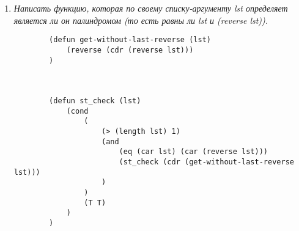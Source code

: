 \begin{enumerate}[wide=0pt]
\begin{lstlisting}
		)
		
		
		(defun check-easy-win (lst)
			(
				or ( = (+ (car lst) (cadr lst)) 7)
				   ( = (+ (car lst) (cadr lst)) 11)
			)
		)
		
		(defun pass_check (lst)
			(
				or
				(   
					and (= (car lst) 1) (= (cadr lst) 1)
				)
				(   
					and (= (car lst) 6) (= (cadr lst) 6)
				)
			)
		)
		
		
		(defun play-game-second-player ()
			(print "Second player throw: ") 
			(setq second_player (bones_throw))
			(print second_player)
		
			(
				cond 
				(
					(check-easy-win second_player)
					(print "Second player wins") 
				)
				(
					(pass_check second_player)
					(play-game-second-player)
				)
				(
					T
					(
						cond
						(
							(
								>
								(+ (car first_player) (cadr first_player))
								(+ (car second_player) (cadr second_player))
							)
							(print "First player wins") 
						)
						(
							(
								<
								(+ (car first_player) (cadr first_player))
								(+ (car second_player) (cadr second_player))
							)
							(print "Second player wins") 
						)
						(
							T
							(print "Draw in the game")
						)
					)
				)
			)
		)
		
		
		(defun play-game-first-player ()
		
			(print "First player throws: ")
			(setq first_player (bones_throw))
			(print first_player)
		
			(
				cond
				(
					(check-easy-win first_player)
					(print "First player wins")
				)
				(
					(pass_check first_player)
					(play-game-first-player)
				)
				(
					T
					(play-game-second-player)
				)
			)
		
		)
		
		
		(play-game-first-player)
	\end{lstlisting}

	\item  \textit{Написать функцию, которая по своему 
	списку-аргументу lst определяет
	является ли он палиндромом (то есть равны ли lst и (reverse lst)).}
	\begin{lstlisting}
		(defun get-without-last-reverse (lst)
			(reverse (cdr (reverse lst)))
		)



		(defun st_check (lst)
			(cond
				(
					(> (length lst) 1)
					(and
						(eq (car lst) (car (reverse lst)))
						(st_check (cdr (get-without-last-reverse lst)))
					)
				)
				(T T)
			)
		)



\end{lstlisting}
\end{enumerate}
